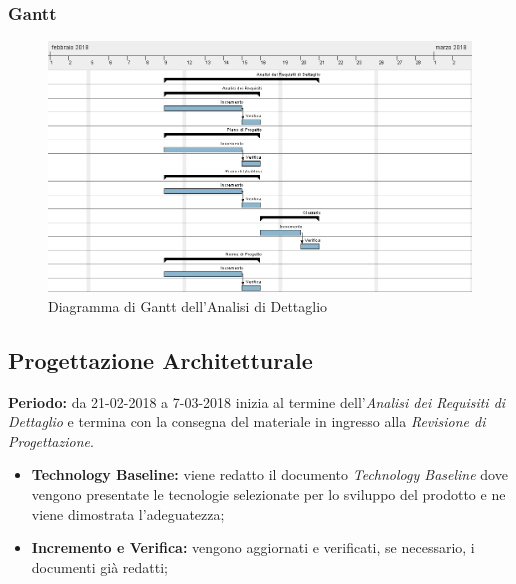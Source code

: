 \subsubsection{Gantt}
\begin{figure}[H]
	\centering 
	\includegraphics[width=1\textwidth]{images/Analisi-Dettaglio.png}
	\caption{Diagramma di Gantt dell'Analisi di Dettaglio}
	\label{graficobello2} 
\end{figure}
\subsection{Progettazione Architetturale}
    \textbf{Periodo:} da 21-02-2018 a 7-03-2018 \Spazio
    inizia al termine dell'\emph{Analisi dei Requisiti di Dettaglio} e termina con la consegna del materiale in ingresso alla \emph{Revisione di Progettazione}.
    \begin{itemize}
    	\item \textbf{Technology Baseline:} viene redatto il documento \emph{Technology Baseline} dove vengono presentate le tecnologie selezionate per lo sviluppo del prodotto e ne viene dimostrata l'adeguatezza;
    	\item \textbf{Incremento e Verifica:} vengono aggiornati e verificati, se necessario, i documenti già redatti;
    \end{itemize}

